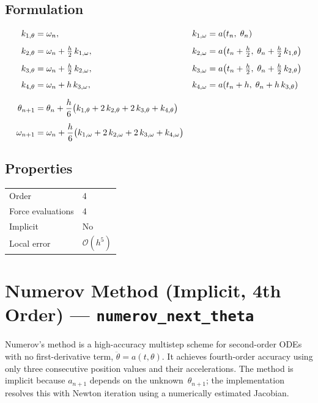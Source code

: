 \documentclass[11pt,a4paper]{article}
\newcommand{\bigO}{\mathcal{O}}
\begin{document}
\subsection{Formulation}
\begin{align}
  k_{1,\theta} &= \omega_n, &
  k_{1,\omega} &= a(t_n,\;\theta_n) \notag\\[4pt]
  k_{2,\theta} &= \omega_n + \tfrac{h}{2}\,k_{1,\omega}, &
  k_{2,\omega} &= a\!\left(t_n + \tfrac{h}{2},\;\theta_n + \tfrac{h}{2}\,k_{1,\theta}\right) \notag\\[4pt]
  k_{3,\theta} &= \omega_n + \tfrac{h}{2}\,k_{2,\omega}, &
  k_{3,\omega} &= a\!\left(t_n + \tfrac{h}{2},\;\theta_n + \tfrac{h}{2}\,k_{2,\theta}\right) \notag\\[4pt]
  k_{4,\theta} &= \omega_n + h\,k_{3,\omega}, &
  k_{4,\omega} &= a\!\left(t_n + h,\;\theta_n + h\,k_{3,\theta}\right) \notag\\[6pt]
  \theta_{n+1} &= \theta_n + \frac{h}{6}\bigl(k_{1,\theta} + 2\,k_{2,\theta}
                   + 2\,k_{3,\theta} + k_{4,\theta}\bigr) \notag\\[4pt]
  \omega_{n+1} &= \omega_n + \frac{h}{6}\bigl(k_{1,\omega} + 2\,k_{2,\omega}
                   + 2\,k_{3,\omega} + k_{4,\omega}\bigr)
  \label{eq:rkn}
\end{align}

\subsection{Properties}
\begin{center}
\begin{tabular}{ll}
  \hline
  Order             & 4 \\
  Force evaluations & 4 \\
  Implicit          & No \\
  Local error       & $\bigO(h^5)$ \\
  \hline
\end{tabular}
\end{center}

\section{Numerov Method (Implicit, 4th Order) --- \texttt{numerov\_next\_theta}}
\label{sec:numerov}

Numerov's method is a high-accuracy multistep scheme for second-order ODEs with
no first-derivative term, $\ddot\theta = a(t,\theta)$. It achieves fourth-order
accuracy using only three consecutive position values and their accelerations.
The method is implicit because $a_{n+1}$ depends on the unknown~$\theta_{n+1}$;
the implementation resolves this with Newton iteration using a numerically
estimated Jacobian.
\end{document}
